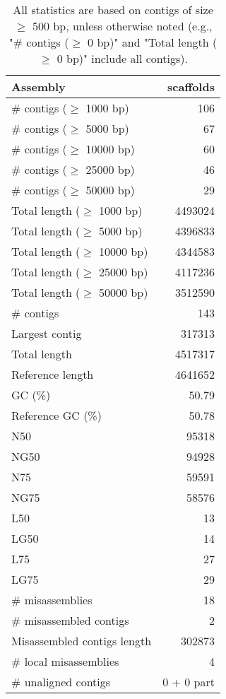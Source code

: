 \documentclass[12pt,a4paper]{article}
\begin{document}
\begin{table}[ht]
\begin{center}
\caption{All statistics are based on contigs of size $\geq$ 500 bp, unless otherwise noted (e.g., "\# contigs ($\geq$ 0 bp)" and "Total length ($\geq$ 0 bp)" include all contigs).}
\begin{tabular}{|l*{1}{|r}|}
\hline
Assembly & scaffolds \\ \hline
\# contigs ($\geq$ 1000 bp) & 106 \\ \hline
\# contigs ($\geq$ 5000 bp) & 67 \\ \hline
\# contigs ($\geq$ 10000 bp) & 60 \\ \hline
\# contigs ($\geq$ 25000 bp) & 46 \\ \hline
\# contigs ($\geq$ 50000 bp) & 29 \\ \hline
Total length ($\geq$ 1000 bp) & 4493024 \\ \hline
Total length ($\geq$ 5000 bp) & 4396833 \\ \hline
Total length ($\geq$ 10000 bp) & 4344583 \\ \hline
Total length ($\geq$ 25000 bp) & 4117236 \\ \hline
Total length ($\geq$ 50000 bp) & 3512590 \\ \hline
\# contigs & 143 \\ \hline
Largest contig & 317313 \\ \hline
Total length & 4517317 \\ \hline
Reference length & 4641652 \\ \hline
GC (\%) & 50.79 \\ \hline
Reference GC (\%) & 50.78 \\ \hline
N50 & 95318 \\ \hline
NG50 & 94928 \\ \hline
N75 & 59591 \\ \hline
NG75 & 58576 \\ \hline
L50 & 13 \\ \hline
LG50 & 14 \\ \hline
L75 & 27 \\ \hline
LG75 & 29 \\ \hline
\# misassemblies & 18 \\ \hline
\# misassembled contigs & 2 \\ \hline
Misassembled contigs length & 302873 \\ \hline
\# local misassemblies & 4 \\ \hline
\# unaligned contigs & 0 + 0 part \\ \hline

\end{tabular}
\end{center}
\end{table}
\end{document}
